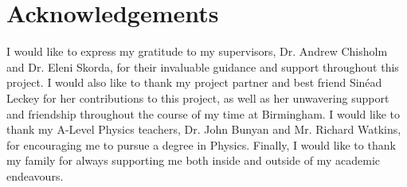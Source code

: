 \documentclass[12pt]{article}
\begin{document}
\section*{Acknowledgements}
I would like to express my gratitude to my supervisors, Dr. Andrew Chisholm and Dr. Eleni Skorda, for their invaluable guidance and support throughout this project. I would also like to thank my project partner and best friend Sinéad Leckey for her contributions to this project, as well as her unwavering support and friendship throughout the course of my time at Birmingham. I would like to thank my A-Level Physics teachers, Dr. John Bunyan and Mr. Richard Watkins, for encouraging me to pursue a degree in Physics. Finally, I would like to thank my family for always supporting me both inside and outside of my academic endeavours.



\pagebreak


\end{document}
